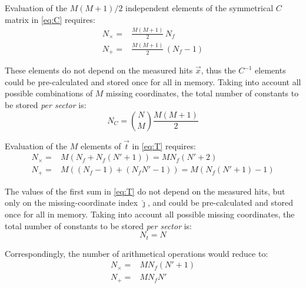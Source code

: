 \documentclass[a4paper,11pt]{article}
\begin{document}
Evaluation of the $M (M+1) / 2$ independent elements
of the symmetrical $C$ matrix in \eqref{eq:C} requires:
\begin{subequations}
  \begin{align}
    N_\times =& \frac{M (M+1)}{2} \, N_f \\
    N_+ =& \frac{M (M+1)}{2} \, (N_f-1)
  \end{align}
\end{subequations}

These elements do not depend on the measured hits
${\vec x}$, thus the $C^{-1}$ elements could be
pre-calculated and stored once for all in memory.
Taking into account all possible combinations of $M$
missing coordinates, the total number of constants
to be stored \emph{per sector} is:
\begin{equation}
N_C = \binom{N}{M} \frac {M (M+1)} 2 \label{eq:NC}
\end{equation}

Evaluation of the $M$ elements of $\vec t$ in \eqref{eq:T}
requires:
\begin{subequations}
  \begin{align}
    N_\times =& M (N_f + N_f (N'+1)) = M N_f (N' + 2)\\
    N_+ =& M ((N_f - 1) + (N_f N' - 1)) = M (N_f (N'+1) -1)
  \end{align}
\end{subequations}

The values of the first sum in \eqref{eq:T}
do not depend on the measured hits, but only
on the missing-coordinate index $\hat \jmath$,
and could be pre-calculated and stored once for all in memory.
Taking into account all possible missing coordinates,
the total number of constants
to be stored \emph{per sector} is:
\begin{equation}
  N_t = N
\end{equation}

Correspondingly, the number of arithmetical operations
would reduce to:
\begin{subequations}
  \begin{align}
    N_\times =& M N_f( N'+1)\\
    N_+ =& M N_f N'
  \end{align}
\end{subequations}
\end{document}
